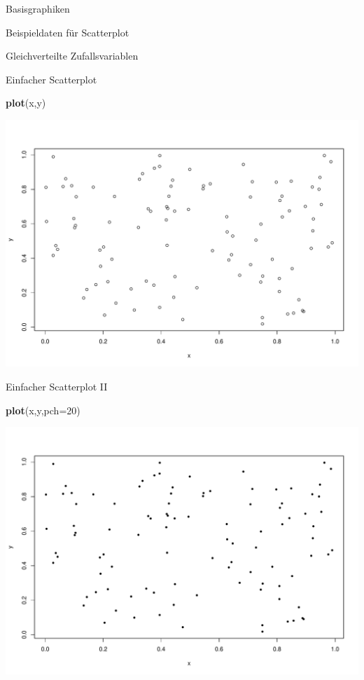 \documentclass[ignorenonframetext,]{beamer}
\newenvironment{Shaded}{}{}
\newcommand{\KeywordTok}[1]{\textcolor[rgb]{0.00,0.44,0.13}{\textbf{{#1}}}}
\newcommand{\DataTypeTok}[1]{\textcolor[rgb]{0.56,0.13,0.00}{{#1}}}
\newcommand{\DecValTok}[1]{\textcolor[rgb]{0.25,0.63,0.44}{{#1}}}
\newcommand{\NormalTok}[1]{{#1}}
\begin{document}
\begin{frame}[fragile]{Basisgraphiken}
\begin{block}{Beispieldaten für Scatterplot}
\begin{block}{Gleichverteilte Zufallsvariablen}
\end{block}

\end{block}

\begin{block}{Einfacher Scatterplot}

\begin{Shaded}
\begin{Highlighting}[]
\KeywordTok{plot}\NormalTok{(x,y)}
\end{Highlighting}
\end{Shaded}

\includegraphics{R_intern_files/figure-beamer/unnamed-chunk-161-1.pdf}

\end{block}

\begin{block}{Einfacher Scatterplot II}

\begin{Shaded}
\begin{Highlighting}[]
\KeywordTok{plot}\NormalTok{(x,y,}\DataTypeTok{pch=}\DecValTok{20}\NormalTok{)}
\end{Highlighting}
\end{Shaded}

\includegraphics{R_intern_files/figure-beamer/unnamed-chunk-162-1.pdf}


\end{block}
\end{frame}
\end{document}
